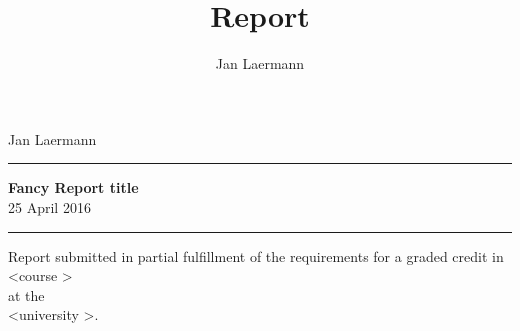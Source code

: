 \documentclass[12pt, a4paper]{scrartcl}
\title{Report}
\author{Jan Laermann}
\date{}
\begin{document}
\begin{center}
  \large
  \qquad  Jan Laermann  \qquad 
\normalsize
\vspace{.5 cm}
\hrule
\vspace{5 cm}
\Huge{\textbf{Fancy Report title}} \\
\normalsize
\vspace{1 cm}
25 April 2016
\end{center}
\thispagestyle{empty}
\vspace{9.5 cm}
\hrule 
\begin{center}
Report submitted in partial fulfillment
of the requirements for a graded credit in 
\textless course \textgreater \\ at the \\ \textless university \textgreater.
\end{center}
\newpage

\newpage
\tableofcontents








\begin{appendix}

\end{appendix}
\end{document}

